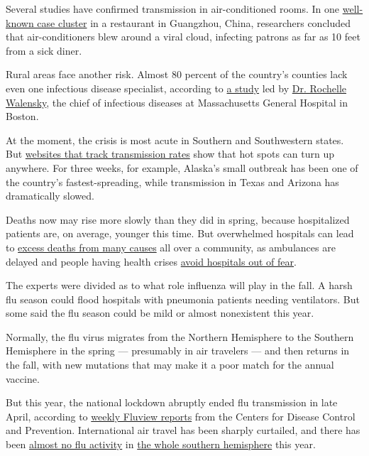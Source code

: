 Several studies have confirmed transmission in air-conditioned rooms. In
one
\href{https://www.nytimes3xbfgragh.onion/2020/04/20/health/airflow-coronavirus-restaurants.html}{well-known
case cluster} in a restaurant in Guangzhou, China, researchers concluded
that air-conditioners blew around a viral cloud, infecting patrons as
far as 10 feet from a sick diner.

Rural areas face another risk. Almost 80 percent of the country's
counties lack even one infectious disease specialist, according to
\href{https://www.acpjournals.org/doi/10.7326/M20-2684}{a study} led by
\href{https://www.massgeneral.org/doctors/17245/rochelle-walensky}{Dr.
Rochelle Walensky}, the chief of infectious diseases at Massachusetts
General Hospital in Boston.

At the moment, the crisis is most acute in Southern and Southwestern
states. But \href{https://rt.live/}{websites that track transmission
rates} show that hot spots can turn up anywhere. For three weeks, for
example, Alaska's small outbreak has been one of the country's
fastest-spreading, while transmission in Texas and Arizona has
dramatically slowed.

Deaths now may rise more slowly than they did in spring, because
hospitalized patients are, on average, younger this time. But
overwhelmed hospitals can lead to
\href{https://www.nytimes3xbfgragh.onion/interactive/2020/06/01/us/coronavirus-deaths-new-york-new-jersey.html}{excess
deaths from many causes} all over a community, as ambulances are delayed
and people having health crises
\href{https://www.nytimes3xbfgragh.onion/2020/06/09/opinion/coronavirus-hospitals-deaths.html}{avoid
hospitals out of fear}.

The experts were divided as to what role influenza will play in the
fall. A harsh flu season could flood hospitals with pneumonia patients
needing ventilators. But some said the flu season could be mild or
almost nonexistent this year.

Normally, the flu virus migrates from the Northern Hemisphere to the
Southern Hemisphere in the spring --- presumably in air travelers ---
and then returns in the fall, with new mutations that may make it a poor
match for the annual vaccine.

But this year, the national lockdown abruptly ended flu transmission in
late April, according to
\href{https://www.cdc.gov/flu/weekly/index.htm}{weekly Fluview reports}
from the Centers for Disease Control and Prevention. International air
travel has been sharply curtailed, and there has been
\href{https://www.abc.net.au/news/2020-06-13/flu-cases-drop-amid-coronavirus-restrictions-statistics-show/12332204}{almost
no flu activity} in
\href{https://www.wsj.com/articles/covid-19-measures-have-all-but-wiped-out-the-flu-in-the-southern-hemisphere-11595440682}{the
whole southern hemisphere} this year.

